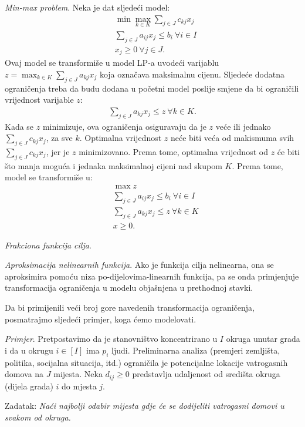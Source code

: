 \documentclass[a4paper, utf8, 11pt, colorlinks]{book}
\begin{document}
 \emph{Min-max problem}. Neka je dat sljedeći model: 
 \begin{align*}
 	  &\min \max_{k \in K} \sum_{j \in J} c_{kj} x_j \\
 	  & \sum_{j \in J} a_{ij} x_j \leq b_i\  \forall i \in I \\
 	  & x_j \geq 0\ \forall j \in J.
 \end{align*}
Ovaj  model se transformiše u model LP-a uvodeći varijablu $z=\max_{k \in K} \sum_{j \in J} a_{kj}x_j$ koja označava maksimalnu cijenu. Sljedeće dodatna ograničenja treba da budu dodana u početni model poslije smjene da bi ograničili vrijednost varijable $z$:
\begin{eqnarray}
	 \sum_{j \in J} a_{kj} x_j \leq z\ \forall k \in K.
\end{eqnarray}
Kada se $z$ minimizuje, ova ograničenja osiguravaju da je $z$ veće ili jednako  $\sum_{j \in J} c_{kj}x_j$, za sve $k$. Optimalna vrijednost $z$ neće biti veća od makismuma svih $\sum_{j \in J} c_{kj}x_j$, jer je $z$ minimizovano. Prema tome, optimalna vrijednost od $z$ će biti što manja moguća i jednaka maksimalnoj cijeni nad skupom $K$. Prema tome, model se transformiše u:
\begin{align*}
	&\max z \\
	&\sum_{j \in J} a_{ij} x_j \leq b_i\  \forall i \in I \\ 
	& 	 \sum_{j \in J} a_{kj} x_j \leq z\ \forall k \in K \\
	& x \geq 0.
\end{align*}
  
  \emph{Frakciona funkcija cilja}. 
  
\emph{Aproksimacija nelinearnih funkcija}. Ako je funkcija cilja nelinearna, ona se aproksimira pomoću niza po-dijelovima-linearnih funkcija, pa se onda primjenjuje transformacija ograničenja u modelu objašnjena u prethodnoj stavki. 

Da bi primijenili veći broj gore navedenih transformacija ograničenja, posmatrajmo sljedeći primjer, koga ćemo modelovati. 


\emph{Primjer}. Pretpostavimo da je stanovništvo koncentrirano u $I$ okruga  unutar grada i da u okrugu $i\in [I]$ ima $p_i$ ljudi. Preliminarna analiza (premjeri zemljišta, politika, socijalna situacija, itd.) ograničila je potencijalne lokacije vatrogasnih domova na $J$ mijesta. Neka $d_{ij} \geq 0$ predstavlja udaljenost od središta okruga (dijela grada) $i$  do mjesta $j$. 

Zadatak: \emph{Naći najbolji odabir mijesta gdje će se dodijeliti vatrogasni domovi u svakom od okruga.}
\end{document}
